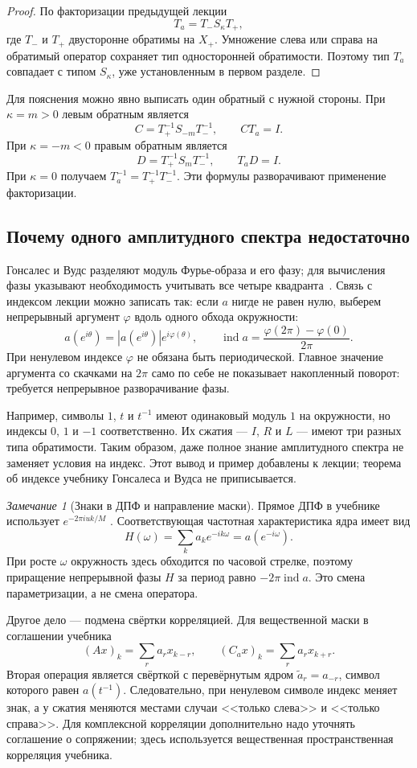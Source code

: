 \documentclass[12pt,a4paper]{article}
\theoremstyle{definition}
\theoremstyle{remark}
\newtheorem*{remark}{Замечание}
\DeclareMathOperator{\ind}{ind}
\begin{document}
\begin{proof}
По факторизации предыдущей лекции
\[
  T_a=T_-S_\kappa T_+,
\]
где $T_-$ и $T_+$ двусторонне обратимы на $X_+$.
Умножение слева или справа на обратимый оператор сохраняет тип
односторонней обратимости. Поэтому тип $T_a$ совпадает с типом
$S_\kappa$, уже установленным в первом разделе.
\end{proof}

Для пояснения можно явно выписать один обратный с нужной стороны.
При $\kappa=m>0$ левым обратным является
\[
  C=T_+^{-1}S_{-m}T_-^{-1},\qquad CT_a=I.
\]
При $\kappa=-m<0$ правым обратным является
\[
  D=T_+^{-1}S_mT_-^{-1},\qquad T_aD=I.
\]
При $\kappa=0$ получаем $T_a^{-1}=T_+^{-1}T_-^{-1}$.
Эти формулы разворачивают применение факторизации.

\subsection*{Почему одного амплитудного спектра недостаточно}

Гонсалес и Вудс разделяют модуль Фурье-образа и его фазу;
для вычисления фазы указывают необходимость учитывать все четыре
квадранта~\cite[\S\,4.6.5, с.~293--294]{GW2012}.
Связь с индексом лекции можно записать так: если $a$ нигде не равен нулю,
выберем непрерывный аргумент $\varphi$ вдоль одного обхода окружности:
\[
  a(e^{i\theta})=|a(e^{i\theta})|e^{i\varphi(\theta)},\qquad
  \ind a=\frac{\varphi(2\pi)-\varphi(0)}{2\pi}.
\]
При ненулевом индексе $\varphi$ не обязана быть периодической.
Главное значение аргумента со скачками на $2\pi$ само по себе
не показывает накопленный поворот: требуется непрерывное
разворачивание фазы.

Например, символы $1$, $t$ и $t^{-1}$ имеют одинаковый модуль $1$
на окружности, но индексы $0$, $1$ и $-1$ соответственно.
Их сжатия --- $I$, $R$ и $L$ --- имеют три разных типа обратимости.
Таким образом, даже полное знание амплитудного спектра не заменяет
условия на индекс. Этот вывод и пример добавлены к лекции;
теорема об индексе учебнику Гонсалеса и Вудса не приписывается.

\begin{remark}[Знаки в ДПФ и направление маски]
Прямое ДПФ в учебнике использует $e^{-2\pi i uk/M}$
\cite[\S\,4.4.1, с.~269]{GW2012}. Соответствующая частотная
характеристика ядра имеет вид
\[
  H(\omega)=\sum_k a_ke^{-ik\omega}=a(e^{-i\omega}).
\]
При росте $\omega$ окружность здесь обходится по часовой стрелке,
поэтому приращение непрерывной фазы $H$ за период равно
$-2\pi\ind a$. Это смена параметризации, а не смена оператора.

Другое дело --- подмена свёртки корреляцией.
Для вещественной маски в соглашении учебника
\cite[\S\,3.4.2, с.~188--192]{GW2012}
\[
  (Ax)_k=\sum_r a_rx_{k-r},\qquad
  (C_ax)_k=\sum_r a_rx_{k+r}.
\]
Вторая операция является свёрткой с перевёрнутым ядром
$\widetilde a_r=a_{-r}$, символ которого равен $a(t^{-1})$.
Следовательно, при ненулевом символе индекс меняет знак,
а у сжатия меняются местами случаи <<только слева>> и <<только справа>>.
Для комплексной корреляции дополнительно надо уточнять соглашение
о сопряжении; здесь используется вещественная пространственная
корреляция учебника.
\end{remark}
\end{document}
